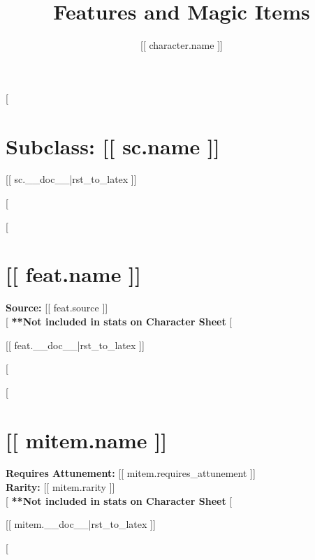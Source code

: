 \documentclass[twocolumn,lettersize]{article}
\title{Features and Magic Items}
\author{[[ character.name ]]}
\date{}
\begin{document}
\maketitle

[%

  \section*{Subclass: [[ sc.name ]]}

  [[ sc.__doc__|rst_to_latex ]]

[%
  
[%

  \section*{[[ feat.name ]]}

  \noindent
  \textbf{Source:} [[ feat.source ]] \\

  [%
    \textbf{**Not included in stats on Character Sheet} %
  [%
             
  [[ feat.__doc__|rst_to_latex ]]

[%

[%

  \section*{[[ mitem.name ]]}

  \noindent
  \textbf{Requires Attunement:} [[ mitem.requires_attunement ]] \\
  \textbf{Rarity:} [[ mitem.rarity ]] \\

  [%
    \textbf{**Not included in stats on Character Sheet} %
  [%
             
  [[ mitem.__doc__|rst_to_latex ]]

  [%
    
\end{document}
